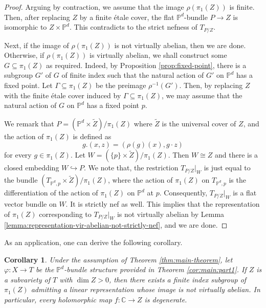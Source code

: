 \documentclass[english,reqno]{amsart}
\newcommand\bbP{{\mathbb P}}
\theoremstyle{plain}
\newtheorem{cor}[thm]{Corollary}
\theoremstyle{definition}
\numberwithin{equation}{section} %
\begin{document}
\begin{proof}
	Arguing by contraction, we assume that the image $\rho(\pi_1(Z))$ is finite. Then, after replacing $Z$ by a finite \'etale cover, the flat $\bbP^d$-bundle $P\rightarrow Z$ is isomorphic to $Z\times \bbP^d$. This contradicts to the strict nefness of $T_{P/Z}$.
	
	Next, if  the image of $\rho(\pi_1(Z))$ is not  virtually abelian, then we are done. Otherwise, if $\rho(\pi_1(Z))$ is  virtually abelian,  we shall construct some $G\subseteq \pi_1(Z)$ as required. Indeed, by Proposition \ref{prop:fixed-point}, there is a   subgroup $G'$ of $G$ of finite index such that the natural action of $G'$ on $\bbP^d$ has a fixed point.  Let $\Gamma \subseteq \pi_1(Z)$ be the preimage $\rho^{-1}(G')$. Then, by replacing $Z$ with the finite \'etale cover induced by $\Gamma \subseteq \pi_1(Z)$, we may assume that the   natural action of $G$ on $\bbP^d$ has a fixed point $p$.
	
	We remark that $P=(\bbP^d\times \widetilde{Z})/\pi_1(Z)$ where $\widetilde{Z}$ is the universal cover of $Z$, and  the action of $\pi_1(Z)$ is defined as $$ g. (x,z) = (\rho(g)(x), g\cdot z) $$ for every $g\in \pi_1(Z)$.
	Let $W=(\{p\}\times \widetilde{Z})/\pi_1(Z)$.
	Then $W\cong Z$ and there is a closed embedding  $W\hookrightarrow P$.
	We note that, the restriction $T_{P/Z}|_W$ is just equal to the bundle $(T_{\bbP^d,p}\times \widetilde{Z})/\pi_1(Z)$, where the action of $\pi_1(Z)$ on $T_{\bbP^d,p}$ is the differentiation of the action of $\pi_1(Z)$ on $\bbP^d$ at $p$.
	Consequently, $T_{P/Z}|_W$ is a flat vector bundle on $W$.
	It is strictly nef as well. This implies that the representation of $\pi_1(Z)$ corresponding to $T_{P/Z}|_W$ is not virtually abelian by Lemma \ref{lemma:representation-vir-abelian-not-strictly-nef}, and we are done.
\end{proof}




As an application, one can   derive the following corollary.


\begin{cor}
	\label{cor:fundamental-group-subvariety}
	Under the assumption of Theorem \ref{thm:main-theorem}, let $\varphi\colon X\rightarrow T$ be the $\bbP^d$-bundle structure provided in Theorem \ref{cor:main:part1}. If $Z$ is a  subvariety of $T$ with $\dim Z>0$, then there exists a finite index subgroup of $\pi_1(Z)$ admitting a linear representation whose image is not virtually abelian. In particular, every holomorphic map $f:\mathbb{C}\rightarrow Z$ is degenerate.
\end{cor}
\end{document}
